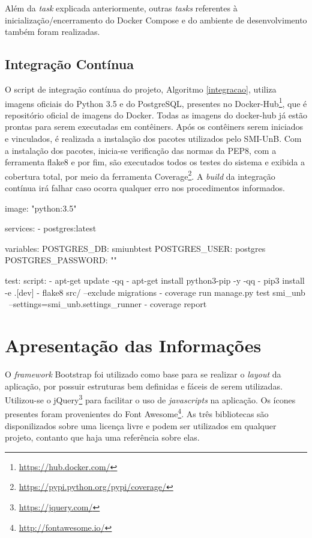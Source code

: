 Além da \textit{task} explicada anteriormente, outras \textit{tasks} referentes à inicialização/encerramento do Docker Compose e do ambiente de desenvolvimento também foram realizadas.

\subsection{Integração Contínua}
O script de integração contínua do projeto, Algoritmo \ref{integracao}, utiliza imagens oficiais do Python 3.5 e do PostgreSQL, presentes no Docker-Hub\footnote{\url{https://hub.docker.com/}}, que é repositório oficial de imagens do Docker. Todas as imagens do docker-hub já estão prontas para serem executadas em contêiners. Após os contêiners serem iniciados e vinculados, é realizada a instalação dos pacotes utilizados pelo SMI-UnB. Com a instalação dos pacotes, inicia-se verificação das normas da PEP8, com a ferramenta flake8 e por fim, são executados todos os testes do sistema e exibida a cobertura total, por meio da ferramenta Coverage\footnote{\url{https://pypi.python.org/pypi/coverage/}}. A \textit{build} da integração contínua irá falhar caso ocorra qualquer erro nos procedimentos informados.

\begin{python}[caption={\textit{Script} para integração contínua do projeto.}, captionpos=b, label={integracao}]
image: "python:3.5"

services:
  - postgres:latest

variables:
  POSTGRES_DB: smiunbtest
  POSTGRES_USER: postgres
  POSTGRES_PASSWORD: ""

test:
    script:
        - apt-get update -qq
        - apt-get install python3-pip -y -qq
        - pip3 install -e .[dev]
        - flake8 src/ --exclude migrations
        - coverage run manage.py test smi_unb \
          --settings=smi_unb.settings_runner
        - coverage report
\end{python}

\section{Apresentação das Informações}
O \textit{framework} Bootstrap foi utilizado como base para se realizar o \textit{layout} da aplicação, por possuir estruturas bem definidas e fáceis de serem utilizadas. Utilizou-se o jQuery\footnote{\url{https://jquery.com/}} para facilitar o uso de \textit{javascripts} na aplicação. Os ícones presentes foram provenientes do Font Awesome\footnote{\url{http://fontawesome.io/}}. As três bibliotecas são disponilizados sobre uma licença livre e podem ser utilizados em qualquer projeto, contanto que haja uma referência sobre elas.

